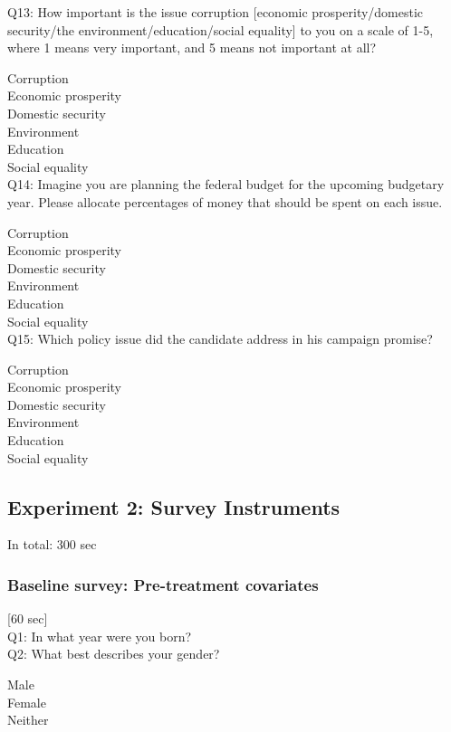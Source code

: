 \documentclass[11pt]{article}
\begin{document}
\noindent Q13: How important is the issue corruption [economic prosperity/domestic security/the environment/education/social equality] to you on a scale of 1-5, where 1 means very important, and 5 means not important at all?

\noindent Corruption\\
Economic prosperity\\
Domestic security\\
Environment\\
Education\\
Social equality\\

\noindent Q14: Imagine you are planning the federal budget for the upcoming budgetary year. Please allocate percentages of money that should be spent on each issue.

\noindent Corruption\\
Economic prosperity\\
Domestic security\\
Environment\\
Education\\
Social equality\\

\noindent Q15: Which policy issue did the candidate address in his campaign promise?

\noindent Corruption\\
Economic prosperity\\
Domestic security\\
Environment\\
Education\\
Social equality\\

\subsection{Experiment 2: Survey Instruments}\label{sec2}
In total: 300 sec

\subsubsection{Baseline survey: Pre-treatment covariates}
[60 sec]\\

\noindent Q1: In what year were you born?\\

\noindent Q2: What best describes your gender?

\noindent Male\\
Female\\
Neither\\
\end{document}
